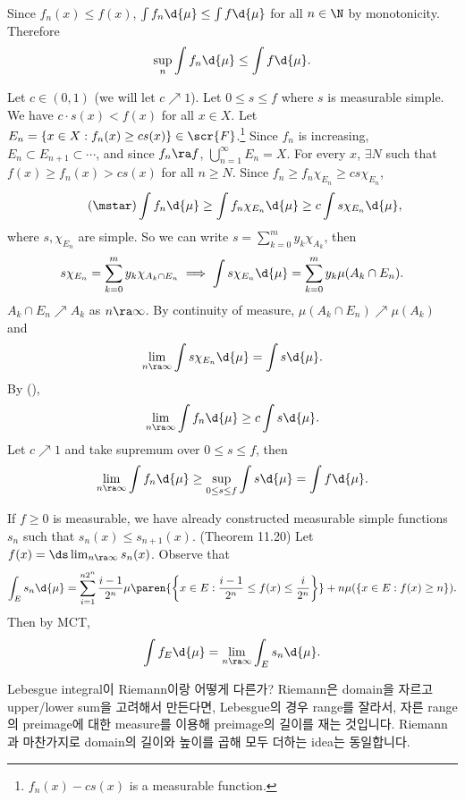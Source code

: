 \pf \\
\note{\(\geq\)} Since \(f_n(x) \leq f(x)\), \(\int f_n \d{\mu} \leq \int f \d{\mu}\) for all \(n\in \N\) by monotonicity. Therefore
\[
    \sup_n \int f_n \d{\mu} \leq \int f \d{\mu}.
\]

\note{\(\leq\)} Let \(c \in (0, 1)\) (we will let \(c \nearrow 1\)). Let \(0 \leq s \leq f\) where \(s\) is measurable simple. We have \(c \cdot s(x) < f(x)\) for all \(x \in X\). Let \(E_n = \{x \in X : f_n(x) \geq cs(x)\} \in \scr{F}\).\footnote{\(f_n(x) - cs(x)\) is a measurable function.} Since \(f_n\) is increasing, \(E_n\subset E_{n+1} \subset \cdots\), and since \(f_n \ra f\), \(\bigcup_{n=1}^\infty E_n = X\). For every \(x\), \(\exists N\) such that \(f(x) \geq f_n(x) > cs(x)\) for all \(n \geq N\). Since \(f_n \geq f_n \chi_{E_n} \geq cs \chi_{E_n}\),
\[ \tag{\mstar}
    \int f_n \d{\mu} \geq \int f_n \chi_{E_n} \d{\mu} \geq c\int s \chi_{E_n} \d{\mu},
\]
where \(s, \chi_{E_n}\) are simple. So we can write \(s = \sum_{k=0}^m y_k \chi_{A_k}\), then
\[
    s\chi_{E_n} = \sum_{k=0}^m y_k \chi_{A_k\cap E_n} \implies \int s \chi_{E_n} \d{\mu} = \sum_{k=0}^m y_k \mu(A_k\cap E_n).
\]
\(A_k\cap E_n \nearrow A_k\) as \(n\ra\infty\). By continuity of measure, \(\mu(A_k \cap E_n) \nearrow \mu(A_k)\) and
\[
    \lim_{n\ra\infty} \int s \chi_{E_n}\d{\mu} = \int s \d{\mu}.
\]
By (\mstar),
\[
    \lim_{n\ra\infty} \int f_n \d{\mu} \geq c\int s \d{\mu}.
\]
Let \(c \nearrow 1\) and take supremum over \(0\leq s\leq f\), then
\[
    \lim_{n\ra\infty} \int f_n \d{\mu} \geq \sup_{0\leq s\leq f} \int s \d{\mu} = \int f \d{\mu}.
\]

\rmk If \(f \geq 0\) is measurable, we have already constructed measurable simple functions \(s_n\) such that \(s_n(x) \leq s_{n+1}(x)\). ({\sffamily Theorem 11.20}) Let \(f(x) = \ds \lim_{n\ra\infty} s_n(x)\). Observe that
\[
    \int_E s_n \d{\mu} = \sum_{i=1}^{n2^n} \frac{i - 1}{2^n}\mu\paren{\left\{x \in E : \frac{i-1}{2^n} \leq f(x) \leq \frac{i}{2^n}\right\}} + n\mu(\{x \in E : f(x)\geq n\}).
\]
Then by MCT,
\[
    \int f_E \d{\mu} = \lim_{n\ra\infty} \int_E s_n \d{\mu}.
\]

\bigskip

Lebesgue integral이 Riemann이랑 어떻게 다른가? Riemann은 domain을 자르고 upper/lower sum을 고려해서 만든다면, Lebesgue의 경우 range를 잘라서, 자른 range의 preimage에 대한 measure를 이용해 preimage의 길이를 재는 것입니다. Riemann과 마찬가지로 domain의 길이와 높이를 곱해 모두 더하는 idea는 동일합니다.

\bigskip

